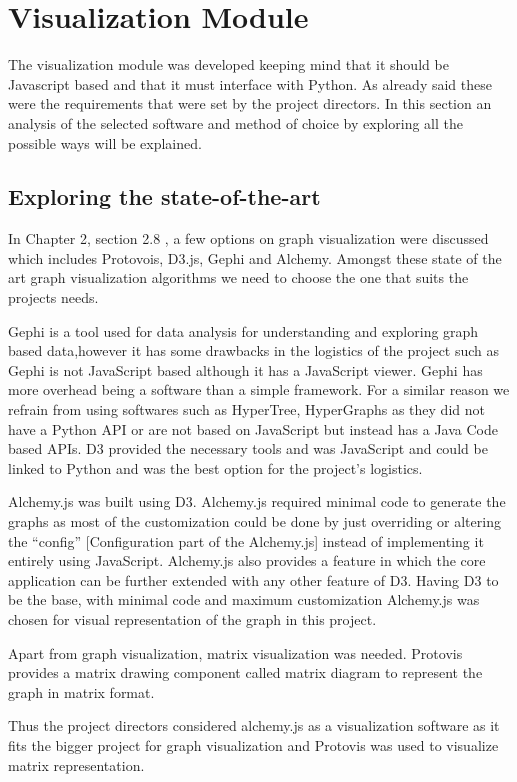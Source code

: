\chapter{Visualization Module}
The visualization module was developed keeping mind that it should be Javascript based and that it must interface with Python. 
As already said these were the requirements that were set by the project directors. In this section an analysis of the selected software and method of choice by exploring all the possible ways will be explained. 
\section{Exploring the state-of-the-art}
\par In Chapter 2, section 2.8 , a few options on graph visualization were discussed which includes Protovois, D3.js, Gephi and Alchemy. Amongst these state of the art graph visualization algorithms we need to choose the one that suits the projects needs. 
\par  Gephi is a tool
used for data analysis for understanding and exploring graph based data,however it has some
drawbacks in the logistics of the project such as Gephi is not JavaScript based although it has a JavaScript viewer. Gephi has more overhead being a software than a simple framework. For a similar reason we refrain from using softwares such as HyperTree, HyperGraphs as they did not have a Python API or are not based on JavaScript but instead has a
Java Code based APIs.  D3
provided the necessary tools and was JavaScript and could be linked to Python and was the best
option for the project's logistics.
\par Alchemy.js was built using D3. Alchemy.js required minimal code
to generate the graphs as most of the customization could be done by just overriding or altering the
“config” [Configuration part of the Alchemy.js] instead of implementing it entirely using
JavaScript. Alchemy.js also provides a feature in which the core application can be further extended
with any other feature of D3. Having D3 to be the base, with minimal code and maximum
customization Alchemy.js was chosen for visual representation of the graph in this project. \par Apart from graph visualization, matrix visualization was needed. Protovis provides a matrix drawing component called matrix diagram to represent the graph in matrix format.

\par Thus the project directors considered alchemy.js as a visualization software as it fits the bigger project for graph visualization and Protovis  was used to visualize matrix representation. 


